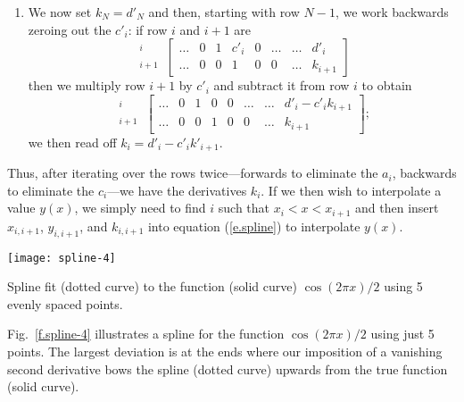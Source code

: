 \begin{enumerate}
\item We now set $k_{N}=d'_{N}$ and then, starting with row $N-1$, we work backwards zeroing out the $c'_{i}$: if row $i$ and $i+1$ are
\[
\begin{array}{r} {}^{i}\\ {}^{i+1}\end{array}\,
\left[\begin{array}{ccccccc|c}
	 \ldots & 0 & 1 & c'_{i} & 0 & \ldots & \ldots & d'_{i}\\
	 \ldots & 0 & 0 & 1      & 0 & 0      & \ldots & k_{i+1}
\end{array}\right]
\]
then we multiply row $i+1$ by $c'_{i}$ and subtract it from row $i$ to obtain
\[
\begin{array}{r} {}^{i}\\ {}^{i+1}\end{array}\,
\left[\begin{array}{ccccccc|c}
	 \ldots & 0 & 1 & 0 & 0 & \ldots & \ldots & d'_{i}-c'_{i}k_{i+1}\\
	 \ldots & 0 & 0 & 1 & 0 & 0      & \ldots & k_{i+1}
\end{array}\right];
\]
we then read off $k_{i} = d'_{i}-c'_{i}k'_{i+1}$.
\end{enumerate}
Thus, after iterating over the rows twice---forwards to eliminate the $a_{i}$, backwards to eliminate the $c_{i}$---we have the derivatives $k_{i}$. If we then wish to interpolate a value $y(x)$, we simply need to find $i$ such that $x_{i}< x < x_{i+1}$ and then insert $x_{i,i+1}$, $y_{i,i+1}$, and $k_{i,i+1}$ into equation (\ref{e.spline}) to interpolate $y(x)$.

\begin{marginfigure}
\texttt{[image: spline-4]}
\caption[Example of a spline fit]{\label{f.spline-4} Spline fit (dotted curve) to the function (solid curve) $\cos(2\pi x)/2$ using 5 evenly spaced points.}
\end{marginfigure}
Fig.~\ref{f.spline-4} illustrates a spline for the function $\cos(2\pi x)/2$ using just 5 points. The largest deviation is at the ends where our imposition of a vanishing second derivative bows the spline (dotted curve) upwards from the true function (solid curve).
